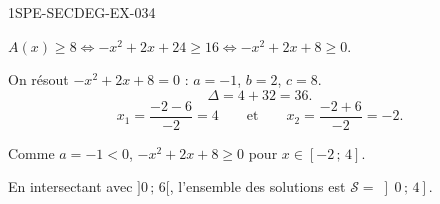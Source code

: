 \begin{corrige}{1SPE-SECDEG-EX-034}

$A(x) \geqslant 8 \iff -x^2 + 2x + 24 \geqslant 16 \iff -x^2 + 2x + 8 \geqslant 0$.

On résout $-x^2 + 2x + 8 = 0$ : $a = -1$, $b = 2$, $c = 8$.
\[\Delta = 4 + 32 = 36.\]
\[x_1 = \frac{-2 - 6}{-2} = 4 \qquad \text{et} \qquad x_2 = \frac{-2 + 6}{-2} = -2.\]

Comme $a = -1 < 0$, $-x^2 + 2x + 8 \geqslant 0$ pour $x \in [-2\,;\,4]$.

En intersectant avec $]0\,;\,6[$, l'ensemble des solutions est $\mathcal{S} = \left]0\,;\,4\right]$.

\end{corrige}
